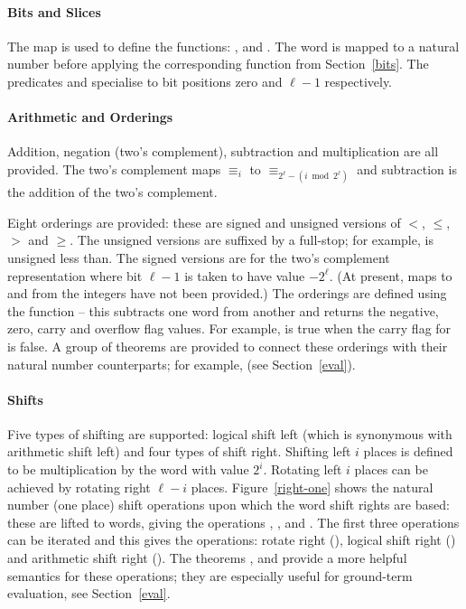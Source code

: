 {\paragraph{Bits and Slices}

The map  is used to define the functions: ,
 and .  The word is mapped to a natural
number before applying the corresponding function from
Section~\ref{bits}.  The predicates  and  specialise
 to bit positions zero and $\ell - 1$ respectively.

\paragraph{Arithmetic and Orderings}

Addition, negation (two's complement), subtraction and multiplication
are all provided.  The two's complement maps ${\equiv_i}$ to
${\equiv_{2^\ell - (i \bmod 2^\ell)}}$ and subtraction is the addition
of the two's complement.

Eight orderings are provided: these are signed and unsigned versions
of $<$, $\leq$, $>$ and $\geq$.  The unsigned versions are suffixed by
a full-stop; for example,  is unsigned less than.  The signed
versions are for the two's complement representation \ie{} where bit
$\ell - 1$ is taken to have value $-2^\ell$.  (At present, maps to and
from the integers have not been provided.)  The orderings are defined
using the function  -- this subtracts one word from
another and returns the negative, zero, carry and overflow flag
values.  For example,  is true when the carry flag for
 is false.  A group of theorems are provided to connect
these orderings with their natural number counterparts; for example,
 (see Section~\ref{eval}).

\paragraph{Shifts}

Five types of shifting are supported: logical shift left (which is
synonymous with arithmetic shift left) and four types of shift right.
Shifting left $i$ places is defined to be multiplication by the word
with value $2^i$.  Rotating left $i$ places can be achieved by
rotating right $\ell - i$ places.  Figure~\ref{right-one} shows the
natural number (one place) shift operations upon which the word shift
rights are based: these are lifted to words, giving the operations
, ,  and .  The
first three operations can be iterated and this gives the operations:
rotate right (\ml{\#>>}), logical shift right (\ml{>>>}) and
arithmetic shift right (\ml{>>}).  The theorems ,
 and  provide a more helpful semantics for
these operations; they are especially useful for ground-term
evaluation, see Section~\ref{eval}.

}
